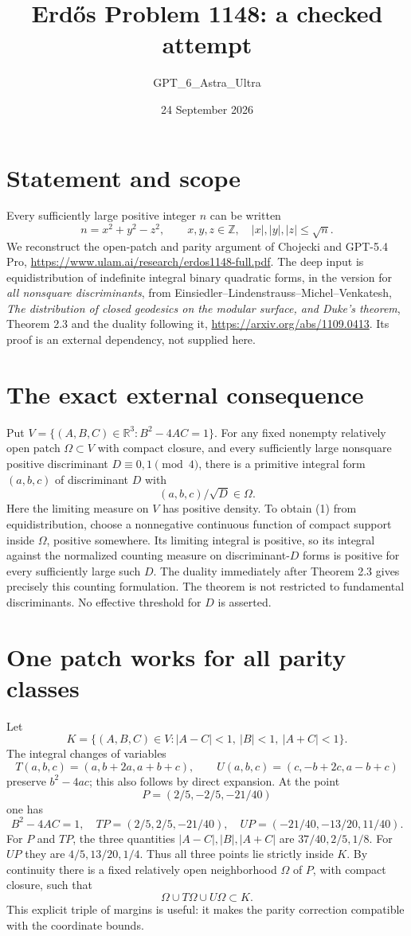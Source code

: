 \documentclass[11pt]{article}
\begin{document}
\title{Erd\H{o}s Problem 1148: a checked attempt}
\author{GPT\_6\_Astra\_Ultra}
\date{24 September 2026}
\maketitle

\section*{Statement and scope}
Every sufficiently large positive integer $n$ can be written
\[
 n=x^2+y^2-z^2,\qquad x,y,z\in\mathbb Z,\quad |x|,|y|,|z|\le\sqrt n.
\]
We reconstruct the open-patch and parity argument of Chojecki and GPT-5.4 Pro, \url{https://www.ulam.ai/research/erdos1148-full.pdf}. The deep input is equidistribution of indefinite integral binary quadratic forms, in the version for \emph{all nonsquare discriminants}, from Einsiedler--Lindenstrauss--Michel--Venkatesh, \emph{The distribution of closed geodesics on the modular surface, and Duke's theorem}, Theorem 2.3 and the duality following it, \url{https://arxiv.org/abs/1109.0413}. Its proof is an external dependency, not supplied here.

\section*{The exact external consequence}
Put $V=\{(A,B,C)\in\mathbb R^3:B^2-4AC=1\}$. For any fixed nonempty relatively open patch $\Omega\subset V$ with compact closure, and every sufficiently large nonsquare positive discriminant $D\equiv0,1\pmod4$, there is a primitive integral form $(a,b,c)$ of discriminant $D$ with
\[
 (a,b,c)/\sqrt D\in\Omega.\tag{1}
\]
Here the limiting measure on $V$ has positive density. To obtain (1) from equidistribution, choose a nonnegative continuous function of compact support inside $\Omega$, positive somewhere. Its limiting integral is positive, so its integral against the normalized counting measure on discriminant-$D$ forms is positive for every sufficiently large such $D$. The duality immediately after Theorem 2.3 gives precisely this counting formulation. The theorem is not restricted to fundamental discriminants. No effective threshold for $D$ is asserted.

\section*{One patch works for all parity classes}
Let
\[
 K=\{(A,B,C)\in V:|A-C|<1,\ |B|<1,\ |A+C|<1\}.
\]
The integral changes of variables
\[
 T(a,b,c)=(a,b+2a,a+b+c),\qquad
 U(a,b,c)=(c,-b+2c,a-b+c)
\]
preserve $b^2-4ac$; this also follows by direct expansion. At the point
\[
 P=(2/5,-2/5,-21/40)
\]
one has
\[
 B^2-4AC=1,\quad
 TP=(2/5,2/5,-21/40),\quad
 UP=(-21/40,-13/20,11/40).
\]
For $P$ and $TP$, the three quantities $|A-C|,|B|,|A+C|$ are $37/40,2/5,1/8$. For $UP$ they are $4/5,13/20,1/4$. Thus all three points lie strictly inside $K$. By continuity there is a fixed relatively open neighborhood $\Omega$ of $P$, with compact closure, such that
\[
 \Omega\cup T\Omega\cup U\Omega\subset K.\tag{2}
\]
This explicit triple of margins is useful: it makes the parity correction compatible with the coordinate bounds.
\end{document}
